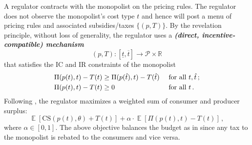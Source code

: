 \documentclass[12pt,letterpaper]{article}
\newenvironment{original}{\color{black}\noindent}{}
\theoremstyle{plain}
\theoremstyle{definition}
\theoremstyle{remark}
\DeclareMathOperator{\E}{\mathds{E}}
\newcommand{\R}{\mathds{R}}
\renewcommand{\1}{\mathds{1}}
\theoremstyle{definition}
\begin{document}
\begin{original}
A regulator contracts with the monopolist on the pricing rules. The regulator does not observe the monopolist's cost type $t$ and hence will post a menu of pricing rules and associated subsidies/taxes $\{(p, T)\}$. By the revelation principle, without loss of generality, the regulator uses a  \textit{\textbf{(direct, incentive-compatible) mechanism}}
\[(p, T): [\underline{t}, \overline{t}] \rightarrow \mathcal{P} \times \R\]
that satisfies the IC and IR constraints of the monopolist
\begin{align*}
 \Pi(p(t), t) - T(t)  &\geq  \Pi(p(\hat{t}), t) - T(\hat{t})  &&\text{ for all $t, \hat{t}$\,;} \\
 \Pi(p(t), t) - T(t)  &\geq  0  &&\text{ for all $t$\,.}
\end{align*}
Following \citet{Baron1982RegulatingCosts}, the regulator maximizes a weighted sum of consumer and producer surplus:
\[\E[\text{CS}(p(t), \theta) + T(t)] + \alpha \cdot \E[\Pi(p(t), t) - T(t)]\,,\]
where $\alpha \in [0, 1]$. The above objective balances the budget as in \citet{Baron1982RegulatingCosts} since any tax to the monopolist is rebated to the consumers and vice versa.
\end{original}
\end{document}
